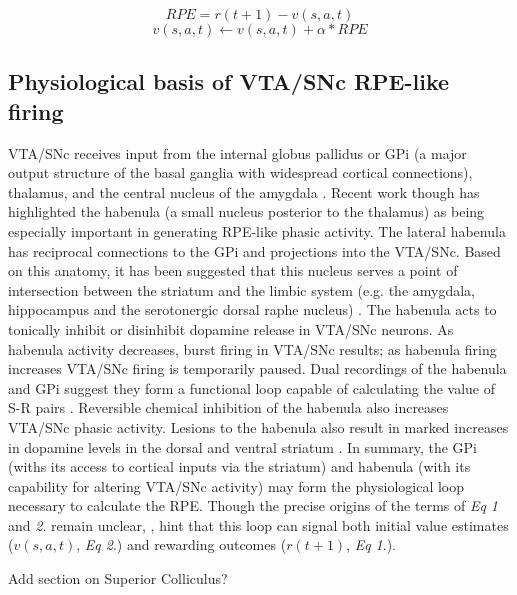 \documentclass[doc,12pt]{apa}        %
\begin{document}
\begin{equation} RPE = r(t+1) - v(s,a,t) \end{equation}
\begin{equation} v(s,a,t) \leftarrow v(s,a,t) + \alpha*RPE \end{equation}
  

\subsection{Physiological basis of VTA/SNc RPE-like firing} %
\label{sub:physiological_basis_of_vta_snc_phasic_firing}
VTA/SNc receives input from the internal globus pallidus or GPi (a major output structure of the basal ganglia with widespread cortical connections), thalamus, and the central nucleus of the amygdala \cite{Botvinick:2008p6594}.  Recent work though has highlighted the habenula (a small nucleus posterior to the thalamus) as being especially important in generating RPE-like phasic activity.  The lateral habenula has reciprocal connections to the GPi and projections into the VTA/SNc. Based on this anatomy, it has been suggested that this nucleus serves a point of intersection between the striatum and the limbic system (e.g. the amygdala, hippocampus and the serotonergic dorsal raphe nucleus) \cite{Hikosaka:2008p4455}.  The habenula acts to tonically inhibit or disinhibit dopamine release in VTA/SNc neurons.  As habenula activity decreases, burst firing in VTA/SNc results; as habenula firing increases VTA/SNc firing is temporarily paused.  Dual recordings of the habenula and GPi suggest they form a functional loop capable of calculating the value of S-R pairs \cite{BrombergMartin:2010p7221}.  Reversible chemical inhibition of the habenula also increases VTA/SNc phasic activity.  Lesions to the habenula also result in marked increases in dopamine levels in the dorsal and ventral striatum \cite{BrombergMartin:2010p7221}.  In summary, the GPi (withs its access to cortical inputs via the striatum) and habenula (with its capability for altering VTA/SNc activity) may form the physiological loop necessary to calculate the RPE. Though the precise origins of the terms of \emph{Eq 1} and \emph{2}. remain unclear, , hint that this loop can signal both initial value estimates ($v(s,a,t)$, \emph{Eq 2}.) and rewarding outcomes ($r(t+1)$, \emph{Eq 1}.).

Add section on Superior Colliculus?
\end{document}

